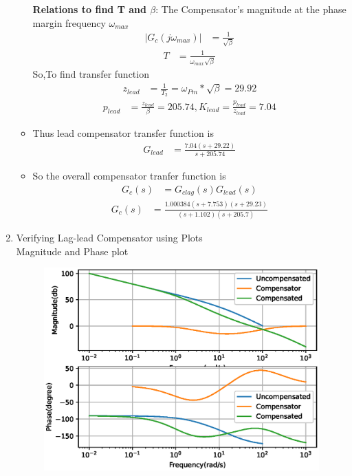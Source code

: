 \begin{enumerate}[label=\thesubsection.\arabic*.,ref=\thesubsection.\theenumi]
\begin{itemize}
\textbf{Relations to find T and $\beta$}:
The Compensator's magnitude at the phase margin frequency $\omega_{max}$
\begin{align}
     |G_{c}(j\omega_{max})| &= \frac{1}{\sqrt{\beta}} 
\end{align}
\begin{align}
    T &= \frac{1}{\omega_{max}\sqrt{\beta}}
\end{align}
So,To find transfer function
\begin{align}
    z_{lead} &= \frac{1}{T_{2}}=\omega_{Pm}*\sqrt{\beta}=29.92
\end{align}
\begin{align}
    p_{lead} &= \frac{z_{lead}}{\beta}=205.74,K_{lead}=\frac{p_{lead}}{z_{lead}}=7.04
\end{align}
\item Thus lead compensator transfer function is 
\begin{align}
    G_{lead} &= \frac{7.04(s+29.22)}{s+205.74} 
\end{align}
\item So the overall compensator tranfer function is
\begin{align}
    G_{c}(s) &= G_{clag}(s)G_{lead}(s)
\end{align}
\begin{align}
G_{c}(s)&=\frac{1.000384(s+7.753)(s+29.23)}{(s+1.102)(s+205.7)}
\end{align}
\end{itemize}
\item Verifying Lag-lead Compensator using Plots \\
\solution 
Magnitude and Phase plot
\begin{figure}[!ht]
\centering
  \includegraphics[width=\columnwidth]{./figs/ee18btech11012/ee18btech11012_2.eps}

\end{figure}
\end{enumerate}
